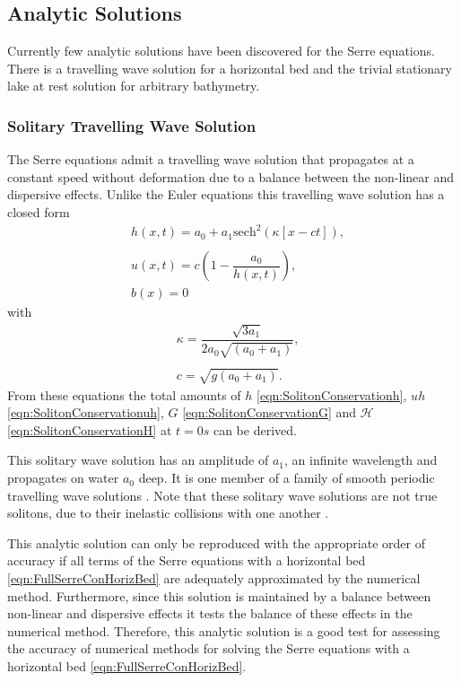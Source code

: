 \subsection{Analytic Solutions}
Currently few analytic solutions have been discovered for the Serre equations. There is a travelling wave solution for a horizontal bed \cite{El-etal-2006} and the trivial stationary lake at rest solution for arbitrary bathymetry.


\subsubsection{Solitary Travelling Wave Solution}
The Serre equations admit a travelling wave solution that propagates at a constant speed without deformation due to a balance between the non-linear and dispersive effects. Unlike the Euler equations this travelling wave solution has a closed form
\begin{subequations}
	\begin{align}
	&h(x,t) = a_0 + a_1\text{sech}^2\left(\kappa \left[x - ct\right]\right), \\  \nonumber \\
	&u(x,t) = c\left(1 - \dfrac{a_0}{h(x,t)}\right), \\
	&b(x) = 0
	\end{align}
	\label{eqn:Solitondefhub}
\end{subequations}
with
\begin{align*}
&\kappa = \dfrac{\sqrt{3a_1}}{2 a_0\sqrt{\left(a_0 + a_1\right)}}, \\ \\
&c = \sqrt{g(a_0 + a_1)}.
\end{align*}
From these equations the total amounts of $h$ \eqref{eqn:SolitonConservationh}, $uh$ \eqref{eqn:SolitonConservationuh}, $G$ \eqref{eqn:SolitonConservationG} and $\mathcal{H}$ \eqref{eqn:SolitonConservationH} at $t=0s$ can be derived.

This solitary wave solution has an amplitude of $a_1$, an infinite wavelength and propagates on water $a_0$ deep. It is one member of a family of smooth periodic travelling wave solutions \cite{El-etal-2006}. Note that these solitary wave solutions are not true solitons, due to their inelastic collisions with one another \cite{Dutykh-etal-2013-761}. 

This analytic solution can only be reproduced with the appropriate order of accuracy if all terms of the Serre equations with a horizontal bed \eqref{eqn:FullSerreConHorizBed} are adequately approximated by the numerical method. Furthermore, since this solution is maintained by a balance between non-linear and dispersive effects it tests the balance of these effects in the numerical method. Therefore, this analytic solution is a good test for assessing the accuracy of numerical methods for solving the Serre equations with a horizontal bed \eqref{eqn:FullSerreConHorizBed}.

